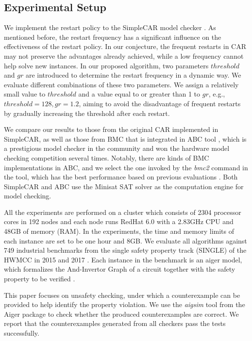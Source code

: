 \subsection{Experimental Setup}
We implement the restart policy to the SimpleCAR model checker \cite{simplecar}. As mentioned before, the restart frequency has a significant influence on the effectiveness of the restart policy. In our conjecture, the frequent restarts in CAR may not preserve the advantages already achieved, while a low frequency cannot help solve new instances. In our proposed algorithm, two parameters $threshold$ and $gr$ are introduced to determine the restart frequency in a dynamic way. We evaluate different combinations of these two parameters. We assign a relatively small value to $threshold$ and a value equal to or greater than 1 to $gr$, e.g., $threshold = 128, gr = 1.2$, aiming to avoid the disadvantage of frequent restarts by gradually increasing the threshold after each restart. 

We compare our results to those from the original CAR implemented in SimpleCAR, as well as those from BMC that is integrated in ABC tool \cite{BM10}, which is a prestigious model checker in the community and won the hardware model checking competition several times. Notably, there are kinds of BMC implementations in ABC, and we select the one invoked by the \emph{bmc2} command in the tool, which has the best performance based on previous evaluations \cite{LDPRV18}. Both SimpleCAR and ABC use the Minisat SAT solver \cite{minisat,ES04} as the computation engine for model checking. 

All the experiments are performed on a cluster which consists of 2304 processor cores in 192 nodes and each node runs RedHat 6.0 with a 2.83GHz CPU and 48GB of memory (RAM). In the experiments, the time and memory limits of each instance are set to be one hour and 8GB.
We evaluate all algorithms against 749 industrial benchmarks from the single safety property track (SINGLE) of the HWMCC in 2015 \cite{hwmcc15} and 2017 \cite{hwmcc17}. Each instance in the benchmark is an aiger model, which formalizes the And-Invertor Graph  of a circuit together with the safety property to be verified \cite{aiger}. 

This paper focuses on unsafety checking, under which a counterexample can be provided to help identify the property violation. We use the \emph{aigsim} tool from the Aiger package \cite{aigertools} to check whether the produced counterexamples are correct. We report that the counterexamples generated from all checkers pass the tests successfully.

